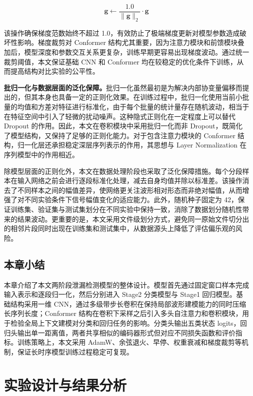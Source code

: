\begin{equation}
\mathbf{g} \leftarrow \frac{1.0}{\|\mathbf{g}\|_2} \cdot \mathbf{g}
\end{equation}

该操作确保梯度范数始终不超过 1.0，有效防止了极端梯度更新对模型参数造成破坏性影响。梯度裁剪对 Conformer 结构尤其重要，因为注意力模块和前馈模块叠加后，模型深度和参数交互关系更复杂，训练早期更容易出现梯度波动。通过统一裁剪阈值，本文保证基础 CNN 和 Conformer 均在较稳定的优化条件下训练，从而提高结构对比实验的公平性。

\noindent\textbf{批归一化与数据层面的泛化保障。}批归一化虽然最初是为解决内部协变量偏移而提出的\cite{ioffe2015batch}，但其本身也具备一定的正则化效果。在训练过程中，批归一化使用当前小批量的均值和方差对特征进行标准化，由于每个批量的统计量存在随机波动，相当于在特征空间中引入了轻微的扰动噪声。这种隐式正则化在一定程度上可以替代 Dropout\cite{srivastava2014dropout} 的作用。因此，本文在卷积模块中采用批归一化而非 Dropout，既简化了模型结构，又保持了足够的正则化能力。对于包含注意力模块的 Conformer 结构，归一化层还承担稳定深层序列表示的作用，其思想与 Layer Normalization\cite{ba2016layernorm} 在序列模型中的作用相近。

除模型层面的正则化外，本文在数据处理阶段也采取了泛化保障措施。每个分段样本在输入网络之前会进行逐段标准化处理，减去自身均值并除以标准差。该操作消去了不同样本之间的幅值差异，使网络更关注波形相对形态而非绝对幅值，从而增强了对不同实验条件下信号幅值变化的适应能力。此外，随机种子固定为 42，保证训练集、验证集与测试集划分在不同实验中保持一致，消除了数据划分随机性带来的结果波动。更重要的是，本文采用文件级划分方式，避免同一原始文件切分出的相邻片段同时出现在训练集和测试集中，从数据源头上降低了评估偏乐观的风险。

\section{本章小结}

本章介绍了本文两阶段泄漏检测模型的整体设计。模型首先通过固定窗口样本完成输入表示和逐段归一化，然后分别进入 Stage2 分类模型与 Stage1 回归模型。基础结构采用一维 CNN，通过多级带步长卷积在保持局部波形建模能力的同时压缩长序列长度；Conformer 结构在卷积下采样之后引入多头自注意力和卷积模块，用于检验全局上下文建模对分类和回归任务的影响。分类头输出五类状态 logits，回归头输出单一距离值，两者共享相似的编码器形式但对应不同损失函数和评价指标。训练策略上，本文采用 AdamW、余弦退火、早停、权重衰减和梯度裁剪等机制，保证长时序模型训练过程稳定可复现。

\chapter{实验设计与结果分析}

